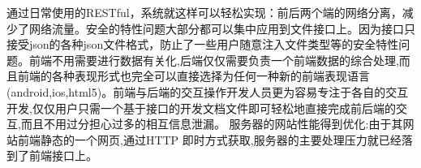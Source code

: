 通过日常使用的RESTful，系统就这样可以轻松实现：前后两个端的网络分离，减少了网络流量。安全的特性问题大部分都可以集中应用到文件接口上。因为接口只接受json的各种json文件格式，防止了一些用户随意注入文件类型等的安全特性问题。前端不用需要进行数据有关化,后端仅仅需要负责一个前端数据的综合处理,而且前端的各种表现形式也完全可以直接选择为任何一种新的前端表现语言(android,ios,html5)。前端与后端的交互操作开发人员更为容易专注于各自的交互开发,仅仅用户只需一个基于接口的开发文档文件即可轻松地直接完成前后端的交互,而且不用过分担心过多的相互信息泄漏。
服务器的网站性能得到优化:由于其网站前端静态的一个网页,通过HTTP 即时方式获取,服务器的主要处理压力就已经落到了前端接口上。
